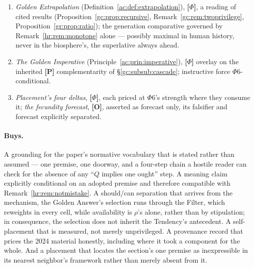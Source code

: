 \documentclass[11pt]{article}
\numberwithin{equation}{section}
\theoremstyle{plain}
\theoremstyle{definition}
\theoremstyle{remark}
\begin{document}
\begin{enumerate}
    \item \emph{Golden Extrapolation} (Definition~\ref{ac:def:extrapolation}), \textbf{[$\Phi$]}, a reading of cited results (Proposition~\ref{gc:prop:recursive}, Remark~\ref{gc:rem:twoprivilege}, Proposition~\ref{gr:prop:ratio}); the generation comparative governed by Remark~\ref{hr:rem:monotone} alone --- possibly maximal in human history, never in the biosphere's, the superlative always ahead.
    \item \emph{The Golden Imperative} (Principle~\ref{ac:prin:imperative}), \textbf{[$\Phi$]} overlay on the inherited \textbf{[P]} complementarity of \S\ref{gc:subsub:cascade}; instructive force $\Phi6$-conditional.
    \item \emph{Placement's four deltas}, \textbf{[$\Phi$]}, each priced at $\Phi6$'s strength where they consume it; \emph{the fecundity forecast}, \textbf{[O]}, asserted as forecast only, its falsifier and forecast explicitly separated.
\end{enumerate}

\paragraph{Buys.} A grounding for the paper's normative vocabulary that is stated rather than assumed --- one premise, one doorway, and a four-step chain a hostile reader can check for the absence of any ``$Q$ implies one ought'' step. A meaning claim explicitly conditional on an adopted premise and therefore compatible with Remark~\ref{hr:rem:notmistake}. A should/can separation that arrives from the mechanism, the Golden Answer's selection runs through the Filter, which reweights in every cell, while availability is $\rho$'s alone, rather than by stipulation; in consequence, the selection does not inherit the Tendency's antecedent. A self-placement that is measured, not merely unprivileged. A provenance record that prices the 2024 material honestly, including where it took a component for the whole. And a placement that locates the section's one premise as inexpressible in its nearest neighbor's framework rather than merely absent from it.
\end{document}
